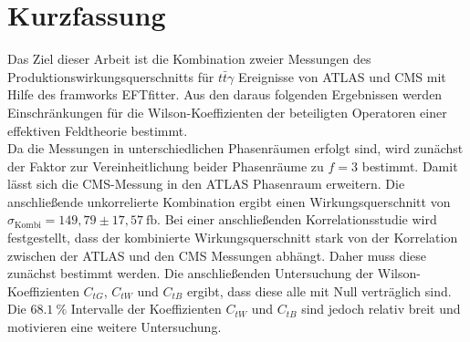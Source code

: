 \thispagestyle{plain}
\section*{Kurzfassung}
Das Ziel dieser Arbeit ist die Kombination zweier Messungen des Produktionswirkungsquerschnitts für $t\bar{t}\gamma$ Ereignisse von ATLAS\cite{Aaboud:2017era} und CMS\cite{Sirunyan:2017iyh} mit Hilfe des framworks EFTfitter\cite{Castro:2016jjv}. Aus den daraus folgenden Ergebnissen werden Einschränkungen für die
Wilson-Koeffizienten der beteiligten Operatoren einer effektiven Feldtheorie bestimmt.\\
Da die Messungen in unterschiedlichen Phasenräumen erfolgt sind, wird zunächst der Faktor zur Vereinheitlichung beider Phasenräume zu $f=3$ bestimmt. Damit lässt sich die CMS-Messung in den ATLAS Phasenraum erweitern. Die anschließende unkorrelierte Kombination ergibt einen Wirkungsquerschnitt von $\sigma_{\text{Kombi}} = 149,79 \pm 17,57~ \si{\femto\barn}$. Bei einer anschließenden Korrelationsstudie wird festgestellt, dass der kombinierte Wirkungsquerschnitt stark von der Korrelation zwischen der ATLAS und den CMS Messungen abhängt. Daher muss diese zunächst bestimmt werden. Die anschließenden Untersuchung der Wilson-Koeffizienten $C_{tG}$, $C_{tW}$ und $C_{tB}$ ergibt, dass diese alle mit Null verträglich sind. Die $\SI{68.1}{\percent}$ Intervalle der Koeffizienten $C_{tW}$ und $C_{tB}$ sind jedoch relativ breit und motivieren eine weitere Untersuchung.
